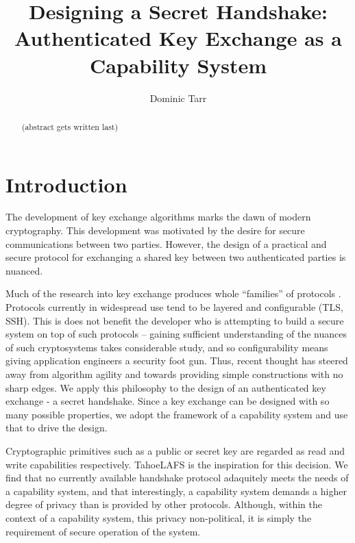 \documentclass[12pt]{article}
\begin{document}
\title{Designing a Secret Handshake: Authenticated Key Exchange as a Capability System}
\author{Dominic Tarr}


\maketitle

\begin{abstract}
  (abstract gets written last)
\end{abstract}

\section{Introduction}

The development of key exchange algorithms marks the dawn of
modern cryptography\cite{ndic}. This development was motivated
by the desire for secure communications between two parties.
However, the design of a practical and secure protocol for exchanging
a shared key between two authenticated parties is nuanced\cite{aake}.

Much of the research into key exchange produces whole ``families'' of
protocols \cite{sigma}. Protocols currently in widespread
use tend to be layered and configurable (TLS, SSH). This is does not
benefit the developer who is attempting to build a secure system on top
of such protocols -- gaining sufficient understanding of the nuances
of such cryptosystems takes considerable study, and so configurability
means giving application engineers a security foot gun. Thus, recent
thought has steered away from algorithm agility and towards providing
simple constructions with no sharp edges\cite{nacl}. We apply this
philosophy to the design of an authenticated key exchange - a secret
handshake. Since a key exchange can be designed with so many possible
properties, we adopt the framework of a capability system and use that
to drive the design.

Cryptographic primitives such as a public or secret key are regarded
as read and write capabilities respectively. TahoeLAFS\cite{tahoe} is
the inspiration for this decision. We find that no currently available
handshake protocol adaquitely meets the needs of a capability system,
and that interestingly, a capability system demands a higher degree
of privacy than is provided by other protocols. Although, within the
context of a capability system, this privacy non-political, it
is simply the requirement of secure operation of the system.
\end{document}
